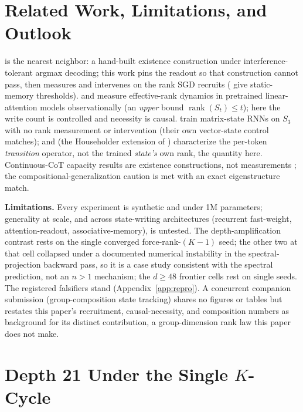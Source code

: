 \documentclass[mlabstract,onecolumn]{jmlr}
\newcommand{\rank}{\operatorname{rank}}
\begin{document}
\section{Related Work, Limitations, and Outlook}
\label{sec:related}

\citet{nichani2025factual} is the nearest neighbor: a hand-built
existence construction under interference-tolerant argmax decoding;
this work pins the readout so that construction cannot pass, then
measures and intervenes on the rank SGD recruits
(\citealp{barnfield2026sharp} give static-memory thresholds).
\citet{nazari2026rank} and \citet{sun2026staterank} measure
effective-rank dynamics in pretrained linear-attention models
observationally (an \emph{upper} bound $\rank(S_t) \leq t$); here the
write count is controlled and necessity is causal. \citet{mishra2026m2rnn} train matrix-state RNNs on $S_3$ with no rank
measurement or intervention (their own vector-state control matches);
\citet{grazzi2025negative} and \citet{siems2025deltaproduct} (the
Householder extension of \citealp{yang2024deltanet}) characterize the
per-token \emph{transition} operator, not the trained \emph{state's}
own rank, the quantity here. Continuous-CoT capacity
results are existence constructions, not measurements
\citep{zhu2025superposition,gozeten2025cot2}; the
compositional-generalization caution
\citep{dziri2023faithfate,wang2024grokked} is met with an exact
eigenstructure match.

\textbf{Limitations.} Every experiment is synthetic and under 1M
parameters; generality at scale, and across state-writing architectures
(recurrent fast-weight, attention-readout, associative-memory), is
untested.
The depth-amplification contrast rests on the single converged
force-rank-$(K{-}1)$ seed; the other two at that cell collapsed under
a documented numerical instability in the spectral-projection backward
pass, so it is a case study consistent with the spectral prediction,
not an $n{>}1$ mechanism; the $d \geq 48$ frontier cells rest on
single seeds. The registered falsifiers stand
(Appendix~\ref{app:repro}). A concurrent companion submission
(group-composition state tracking) shares no figures or tables but
restates this paper's recruitment, causal-necessity, and composition
numbers as background for its distinct contribution, a group-dimension
rank law this paper does not make.

\appendix

\section{Depth 21 Under the Single $K$-Cycle}
\label{app:period}
\end{document}
